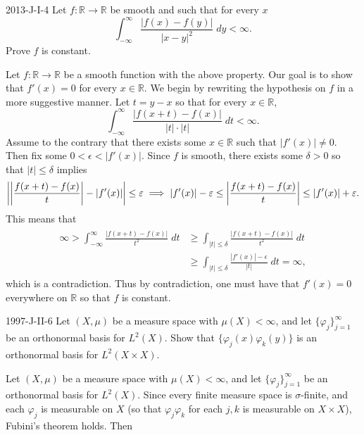 \documentclass{article}
\begin{document}
 	\begin{prb}{2013-J-I-4}
 		Let $f: \mathbb{R}\to \mathbb{R}$ be smooth and such that for every $x$ 
 		\begin{equation*}
 			\int_{-\infty}^{\infty}\frac{|f(x) - f(y)|}{|x - y|^2}\;dy < \infty. 
 		\end{equation*}
 		Prove $f$ is constant. 
 	\end{prb}
 	Let $f: \mathbb{R} \to \mathbb{R}$ be a smooth function with the above property. Our goal is to show that $f'(x) = 0$ for every $x \in \mathbb{R}$. We begin by rewriting the hypothesis on $f$ in a more suggestive manner. Let $t = y - x$ so that for every $x \in \mathbb{R}$, 
 	\begin{equation*}
 		\int_{-\infty}^{\infty}\frac{|f(x + t) - f(x)|}{|t| \cdot |t|}\;dt <\infty. 
 	\end{equation*}
 	Assume to the contrary that there exists some $x \in \mathbb{R}$ such that $|f'(x)| \neq 0$. Then fix some $0 < \epsilon < |f'(x)|$. Since $f$ is smooth, there exists some $\delta > 0$ so that $|t| \leq \delta$ implies 
 	\begin{equation*}
 		\left| \left| \frac{f(x + t) - f(x)}{t} \right| - |f'(x)| \right| \leq \varepsilon \implies |f'(x)| - \varepsilon \leq \left| \frac{f(x + t) - f(x)}{t} \right| \leq |f'(x)| + \varepsilon. 
 	\end{equation*}
 	This means that 
 	\begin{align*}
 		\begin{split}
 			\infty > \int_{-\infty}^{\infty}\frac{|f(x + t) - f(x)|}{t^2}\;dt &\geq \int_{|t|\leq \delta}\frac{|f(x + t) - f(x)|}{t^2}\;dt \\
 			&\geq \int_{|t|\leq \delta}\frac{|f'(x)| - \epsilon}{|t|}\;dt = \infty, 
 		\end{split}
 	\end{align*}
 	which is a contradiction. Thus by contradiction, one must have that $f'(x) = 0$ everywhere on $\mathbb{R}$ so that $f$ is constant. 
	\begin{prb}{1997-J-II-6}
		Let $(X, \mu)$ be a measure space with $\mu(X) < \infty$, and let $\{\varphi_{j}\}_{j =1}^{\infty}$ be an orthonormal basis for $L^2(X)$. Show that $\{\varphi_{j}(x)\varphi_{k}(y)\}$ is an orthonormal basis for $L^2(X \times X)$. 
	\end{prb}
	Let $(X, \mu)$ be a measure space with $\mu(X) < \infty$, and let $\{\varphi_{j}\}_{j = 1}^{\infty}$ be an orthonormal basis for $L^2(X)$. Since every finite measure space is $\sigma$-finite, and each $\varphi_{j}$ is measurable on $X$ (so that $\varphi_{j}\varphi_{k}$ for each $j, k$ is measurable on $X \times X$), Fubini's theorem holds. Then 
\end{document}
